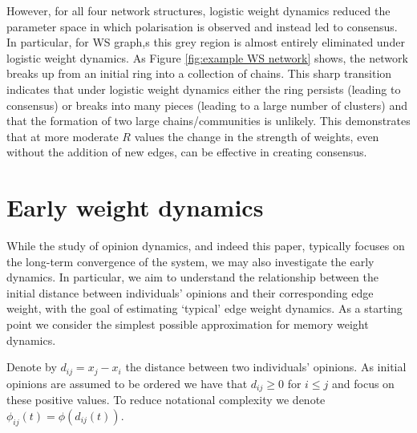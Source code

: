 \documentclass{article}
\begin{document}
However, for all four network structures, logistic weight dynamics reduced the parameter space in which polarisation is observed and instead led to consensus. In particular, for WS graph,s this grey region is almost entirely eliminated under logistic weight dynamics. As Figure \ref{fig:example WS network} shows, the network breaks up from an initial ring into a collection of chains. This sharp transition indicates that under logistic weight dynamics either the ring persists (leading to consensus) or breaks into many pieces (leading to a large number of clusters) and that the formation of two large chains/communities is unlikely. This demonstrates that at more moderate $R$ values the change in the strength of weights, even without the addition of new edges, can be effective in creating consensus. 

\section{Early weight dynamics} \label{Section: Early dynamics}

While the study of opinion dynamics, and indeed this paper, typically focuses on the long-term convergence of the system, we may also investigate the early dynamics. In particular, we aim to understand the relationship between the initial distance between individuals' opinions and their corresponding edge weight, with the goal of estimating `typical' edge weight dynamics. As a starting point we consider the simplest possible approximation for memory weight dynamics. 

Denote by $d_{ij} = x_j - x_i$ the distance between two individuals' opinions. As initial opinions are assumed to be ordered we have that $d_{ij} \geq 0$ for $i\leq j$ and focus on these positive values. To reduce notational complexity we denote $\phi_{ij}(t) = \phi(d_{ij}(t))$. 
\end{document}
